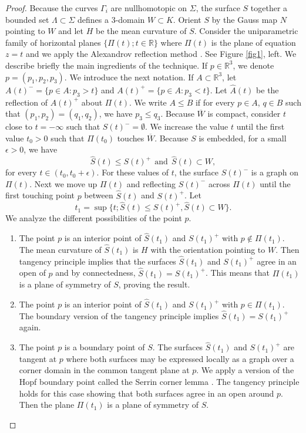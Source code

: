 \documentclass[12pt,a4paper]{amsart}
\begin{document}
\begin{proof} Because the curves $\Gamma_i$ are nullhomotopic on $\Sigma$, the surface $S$ together a bounded set $\Lambda\subset\Sigma$ defines a $3$-domain $W\subset K$. Orient $S$ by the Gauss map $N$ pointing to $W$ and let $H$ be the mean curvature of $S$. Consider the uniparametric family of horizontal planes $\{\Pi(t);t\in{\mathbb R}\}$ where $\Pi(t)$ is the plane of equation $z=t$ and we apply the Alexandrov reflection method \cite{al}. See Figure \ref{fig1}, left. We describe briefly the main ingredients of the technique. If $p\in{\mathbb R}^3$, we denote $p=(p_1,p_2,p_3)$. We introduce the next notation. If $A\subset{\mathbb R}^3$, let $A(t)^{-}=\{p\in A: p_3> t\}$ and $A(t)^{+}=\{p\in A: p_3< t\}$. Let $\hat{A}(t)$ be the reflection of $A(t)^+$ about $\Pi(t)$. We write $A\leq B$ if for every $p\in A$, $q\in B$ such that $(p_1,p_2)=(q_1,q_2)$, we have $p_3\leq q_3$.
Because $\overline{W}$ is compact, consider $t$ close to $t=-\infty$ such that $S(t)^{-}=\emptyset$. We increase the value $t$ until the first value $t_0>0$ such that $\Pi(t_0)$ touches $\overline{W}$. Because $S$ is embedded, for a small $\epsilon>0$, we have $$\hat{S}(t)\leq S(t)^{+}\ \ \mbox{and}\ \ \hat{S}(t)\subset W,$$
for every $t\in (t_0,t_0+\epsilon)$. For these values of $t$, the surface $S(t)^{-}$ is a graph on $\Pi(t)$. Next we move up $\Pi(t)$ and reflecting $S(t)^{-}$ across $\Pi(t)$ until the first touching point $p$ between $\hat{S}(t)$ and $S(t)^{+}$. Let
$$t_1=\sup\{t; \hat{S}(t)\leq S(t)^{+}, \hat{S}(t)\subset W\}.$$
We analyze the different possibilities of the point $p$.
\begin{enumerate}
\item The point $p$ is an interior point of $\hat{S}(t_1)$ and $S(t_1)^+$ with $p\not\in \Pi(t_1)$. The mean curvature of $\hat{S}(t_1)$ is $H$ with the orientation pointing to $W$. Then tangency principle implies that the surfaces $\hat{S}(t_1)$ and $S(t_1)^+$ agree in an open of $p$ and by connectedness, $\hat{S}(t_1)=S(t_1)^+$. This means that $\Pi(t_1)$ is a plane of symmetry of $S$, proving the result.
\item The point $p$ is an interior point of $\hat{S}(t_1)$ and $S(t_1)^+$ with $p\in \Pi(t_1)$. The boundary version of the tangency principle implies $\hat{S}(t_1)=S(t_1)^+$ again.
\item The point $p$ is a boundary point of $S$. The surfaces $\hat{S}(t_1)$ and $S(t_1)^+$ are tangent at $p$ where both surfaces may be expressed locally as a graph over a corner domain in the common tangent plane at $p$. We apply a version of the Hopf boundary point called the Serrin corner lemma \cite{se2}. The tangency principle holds for this case showing that both surfaces agree in an open around $p$. Then the plane $\Pi(t_1)$ is a plane of symmetry of $S$.

\end{enumerate}
\end{proof}
\end{document}
